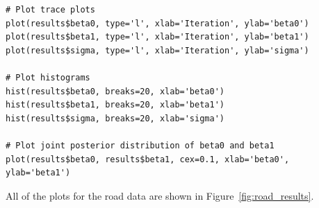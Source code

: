 \begin{verbatim}
# Plot trace plots
plot(results$beta0, type='l', xlab='Iteration', ylab='beta0')
plot(results$beta1, type='l', xlab='Iteration', ylab='beta1')
plot(results$sigma, type='l', xlab='Iteration', ylab='sigma')

# Plot histograms
hist(results$beta0, breaks=20, xlab='beta0')
hist(results$beta1, breaks=20, xlab='beta1')
hist(results$sigma, breaks=20, xlab='sigma')

# Plot joint posterior distribution of beta0 and beta1
plot(results$beta0, results$beta1, cex=0.1, xlab='beta0', ylab='beta1')
\end{verbatim}

All of the plots for the road data are shown in Figure~\ref{fig:road_results}.
